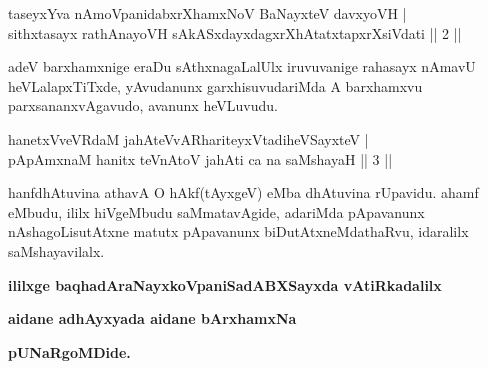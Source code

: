 
\begin{shl}
taseyxYva nAmoVpanidabxrXhamxNoV BaNayxteV davxyoVH | \\
sithxtasayx rathAnayoVH sAkASxdayxdagxrXhAtatxtapxrXsiVdati \hfill ||  2 || 
\end{shl}

\begin{artha}
adeV barxhamxnige eraDu sAthxnagaLalUlx iruvuvanige rahasayx nAmavU heVLalapxTiTxde, yAvudanunx garxhisuvudariMda A barxhamxvu parxsananxvAgavudo, avanunx heVLuvudu.
\end{artha}


\begin{shl}
hanetxVveVRdaM jahAteVvAR\s hariteyxVtadiheVSayxteV | \\
pApAmxnaM hanitx teVnAtoV jahAti ca na saMshayaH \hfill ||  3 || 
\end{shl}

\begin{artha}
hanfdhAtuvina athavA O hAkf(tAyxgeV) eMba dhAtuvina rUpavidu. ahamf eMbudu, ililx hiVgeMbudu saMmatavAgide, adariMda pApavanunx nAshagoLisutAtxne matutx pApavanunx biDutAtxneMdathaRvu, idaralilx saMshayavilalx.
\end{artha}

\begin{center}
{\bf ililxge baqhadAraNayxkoVpaniSadABXSayxda vAtiRkadalilx}
\smallskip

{\bf aidane adhAyxyada aidane bArxhamxNa}
\smallskip

{\bf pUNaRgoMDide.}
\end{center}
